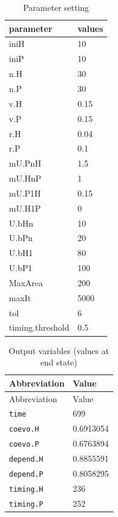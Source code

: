 \documentclass[
]{book}
\begin{document}
\begin{table}[!h]

\caption{\label{tab:1runcoevocoetaparspdf}Parameter setting}
\centering
\begin{tabular}[t]{l|l}
\hline
parameter & values\\
\hline
iniH & 10\\
\hline
iniP & 10\\
\hline
n.H & 30\\
\hline
n.P & 30\\
\hline
v.H & 0.15\\
\hline
v.P & 0.15\\
\hline
r.H & 0.04\\
\hline
r.P & 0.1\\
\hline
mU.PnH & 1.5\\
\hline
mU.HnP & 1\\
\hline
mU.P1H & 0.15\\
\hline
mU.H1P & 0\\
\hline
U.bHn & 10\\
\hline
U.bPn & 20\\
\hline
U.bH1 & 80\\
\hline
U.bP1 & 100\\
\hline
MaxArea & 200\\
\hline
maxIt & 5000\\
\hline
tol & 6\\
\hline
timing.threshold & 0.5\\
\hline
\end{tabular}
\end{table}

\vspace{1cm}

\begin{longtable}[]{@{}ll@{}}
\caption{Output variables (values at end state)}\tabularnewline
\toprule
Abbreviation & Value\tabularnewline
\midrule
\endfirsthead
\toprule
Abbreviation & Value\tabularnewline
\midrule
\endhead
\texttt{time} & 699\tabularnewline
\texttt{coevo.H} & 0.6913054\tabularnewline
\texttt{coevo.P} & 0.6763894\tabularnewline
\texttt{depend.H} & 0.8855591\tabularnewline
\texttt{depend.P} & 0.8058295\tabularnewline
\texttt{timing.H} & 236\tabularnewline
\texttt{timing.P} & 252\tabularnewline
\bottomrule
\end{longtable}

\newpage
\end{document}
